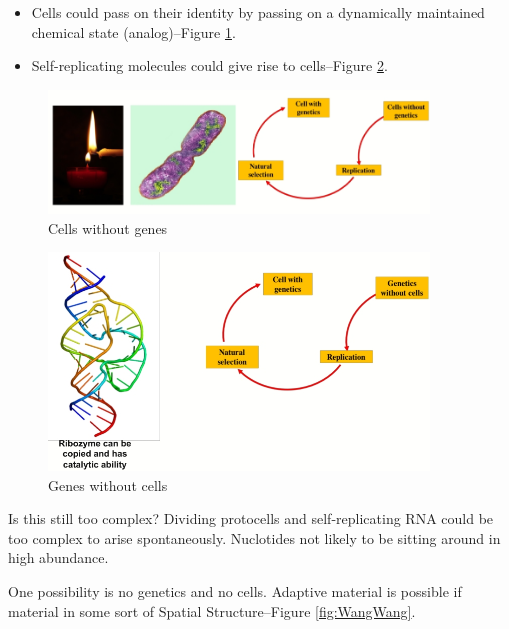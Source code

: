 \documentclass[]{article}
\begin{document}
\begin{itemize}
	\item Cells could pass on their identity by passing on a
	dynamically maintained chemical state (analog)--Figure \ref{fig:CellWithoutGenes}.
	\item Self-replicating molecules could give rise to cells--Figure \ref{fig:GenesWithoutCells}.
\end{itemize}

\begin{figure}[H]
	\caption{Cells without genes}\label{fig:CellWithoutGenes}
	\includegraphics[width=0.9\textwidth]{CellWithoutGenes}
\end{figure}

\begin{figure}[H]
	\caption{Genes without cells}\label{fig:GenesWithoutCells}
	\includegraphics[width=0.9\textwidth]{GenesWithoutCells}
\end{figure}

Is this still too complex? Dividing protocells and self-replicating RNA could
be too complex to arise spontaneously. Nuclotides not likely to be sitting around in high abundance.

One possibility is no genetics and no cells. Adaptive material is possible if material in some sort of Spatial Structure--Figure \ref{fig:WangWang}\cite{wang2015evolution}.
\end{document}
